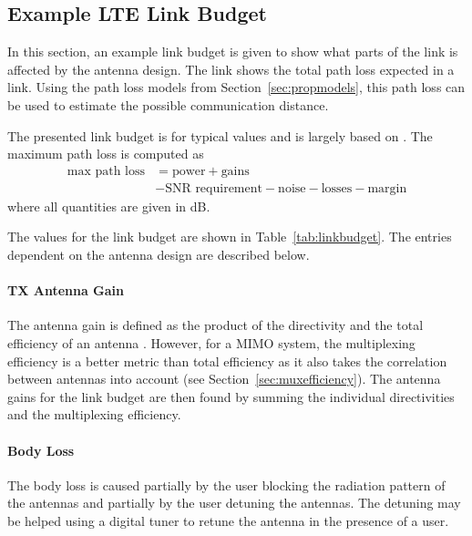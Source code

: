 \subsection{Example LTE Link Budget}
In this section, an example link budget is given to show what parts of the link is affected by the antenna design. The link shows the total path loss expected in a link. Using the path loss models from Section~\ref{sec:propmodels}, this path loss can be used to estimate the possible communication distance.

The presented link budget is for typical values and is largely based on \cite{holma2011lte}. The maximum path loss is computed as
\begin{equation}
    \label{eq:linkbudget}
    \begin{aligned}
        \text{max path loss} &= \text{power} + \text{gains}\\
        &- \text{SNR requirement} - \text{noise} - \text{losses} - \text{margin}
    \end{aligned}
\end{equation}
where all quantities are given in dB. 

The values for the link budget are shown in Table~\ref{tab:linkbudget}. The entries dependent on the antenna design are described below.

\paragraph{TX Antenna Gain} The antenna gain is defined as the product of the directivity and the total efficiency of an antenna \cite{balanis2012antenna}. However, for a MIMO system, the multiplexing efficiency is a better metric than total efficiency as it also takes the correlation between antennas into account (see Section~\ref{sec:muxefficiency}). The antenna gains for the link budget are then found by summing the individual directivities and the multiplexing efficiency.

\paragraph{Body Loss} The body loss is caused partially by the user blocking the radiation pattern of the antennas and partially by the user detuning the antennas. The detuning may be helped using a digital tuner to retune the antenna in the presence of a user.

